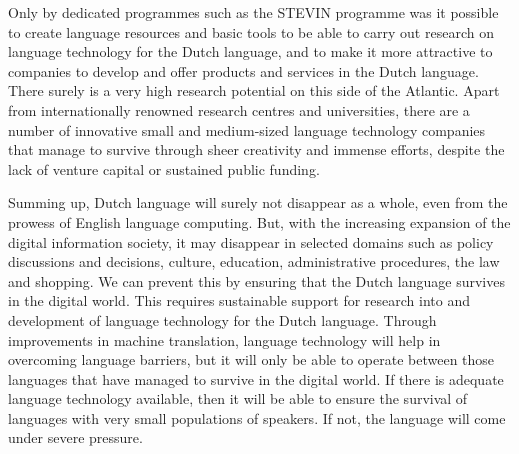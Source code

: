 \begin{multicols}{2}
Only by dedicated programmes such as the STEVIN programme was it possible to create language resources and basic tools to be able to carry out research on language technology for the Dutch language, and to make it more attractive to companies to develop and offer products and services in the Dutch language. There surely is a very high research potential on this side of the Atlantic. Apart from internationally renowned research centres and universities, there are a number of innovative small and medium-sized language technology companies that manage to survive through sheer creativity and immense efforts, despite the lack of venture capital or sustained public funding.

Summing up, Dutch language will surely not disappear as a whole, even from the prowess of English language computing. But, with the increasing expansion of the digital information society, it may disappear in selected domains such as policy discussions and decisions, culture, education, administrative procedures, the law and shopping. We can prevent this by ensuring that the Dutch language survives in the digital world. This requires sustainable support for research into and development of language technology for the Dutch language. Through improvements in machine translation, language technology will help in overcoming language barriers, but it will only be able to operate between those languages that have managed to survive in the digital world. If there is adequate language technology available, then it will be able to ensure the survival of languages with very small populations of speakers. If not, the language will come under severe pressure.


\end{multicols}

\clearpage



